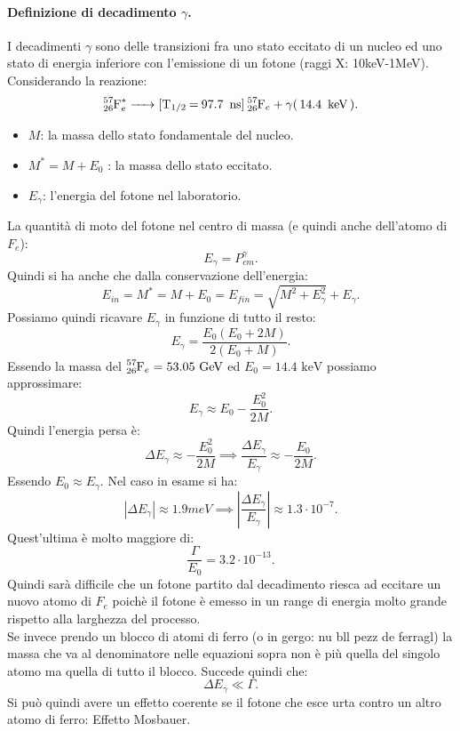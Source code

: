 \paragraph{Definizione di decadimento $\gamma$.}
I decadimenti $\gamma$ sono delle transizioni fra uno stato eccitato di un nucleo ed uno stato di energia inferiore con l'emissione di un fotone (raggi X: 10keV-1MeV).\\
Considerando la reazione:
\[
	\ce{\ce{^{57}_{26}F^*_e} -> [T_{1/2} = 97.7 \text{ ns}] \ce{^{57}_{26}F_e} + \gamma ( 14.4 \text{ keV} ) }
.\] 
\begin{itemize}
	\item $M$: la massa dello stato fondamentale del nucleo.
	\item $M^* = M + E_0$ : la massa dello stato eccitato. 
	\item $E_\gamma$: l'energia del fotone nel laboratorio.	
\end{itemize}
La quantità di moto del fotone nel centro di massa (e quindi anche dell'atomo di $F_e$):
\[
	E_\gamma = P^\gamma_{cm}
.\] 
Quindi si ha anche che dalla conservazione dell'energia:
\[
	E_{in} = M^* = M + E_0 = E_{fin} = \sqrt{M^2 + E_\gamma^2} + E_\gamma 
.\]
Possiamo quindi ricavare $E_\gamma$ in funzione di tutto il resto:
\[
	E_\gamma = \frac{E_0\left( E_0 + 2M \right)}{2\left( E_0 + M \right)} 
.\]
Essendo la massa del $\ce{^{57}_{26}F_e} = 53.05 \text{ GeV}$ ed $E_0 = 14.4 \text{ keV}$ possiamo approssimare:
\[
	E_\gamma  \approx E_0 - \frac{E_0^2}{2M}
.\] 
Quindi l'energia persa è:
\[
	\Delta E_\gamma \approx - \frac{E_0^2}{2M} \implies \frac{\Delta E_\gamma}{E_\gamma} \approx - \frac{E_0}{2M}  
.\]
Essendo $E_0 \approx E_\gamma$. Nel caso in esame si ha:
\[
	\left| \Delta E_\gamma \right| \approx 1.9 meV \implies \left| \frac{\Delta E_\gamma}{E_\gamma}\right| \approx 1.3 \cdot 10^{-7} 
.\] 
Quest'ultima è molto maggiore di:
\[
	\frac{\Gamma}{E_0} = 3.2 \cdot 10^{-13} 
.\] 
Quindi sarà difficile che un fotone partito dal decadimento riesca ad eccitare un nuovo atomo di $F_e$ poichè il fotone è emesso in un range di energia molto grande rispetto alla larghezza del processo.\\
Se invece prendo un blocco di atomi di ferro (o in gergo: nu bll pezz de ferragl) la massa che va al denominatore nelle equazioni sopra non è più quella del singolo atomo ma quella di tutto il blocco. Succede quindi che:
\[
	\Delta E_\gamma \ll \Gamma 
.\] 
Si può quindi avere un effetto coerente se il fotone che esce urta contro un altro atomo di ferro: Effetto Mosbauer.

